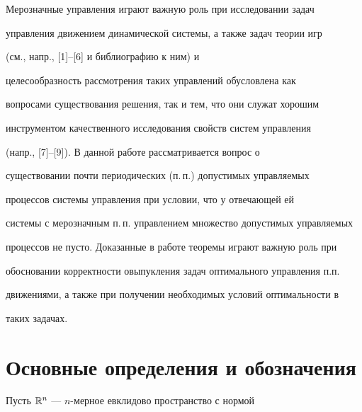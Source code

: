 \pagestyle{plain} %







\maketitle


\label{begin}








Мерозначные управления играют важную роль при исследовании задач


управления движением динамической системы, а также задач теории игр


(см., напр., [1]--[6] и библиографию к ним) и


целесообразность рассмотрения таких управлений обусловлена как


вопросами существования решения, так и тем, что они служат хорошим


инструментом качественного исследования свойств систем управления


(напр., [7]--[9]). В данной работе рассматривается вопрос о


существовании почти периодических (п.\,п.) допустимых управляемых


процессов системы управления при условии, что у отвечающей ей


системы с мерозначным п.\,п. управлением множество допустимых управляемых


процессов не пусто. Доказанные в работе теоремы играют важную роль при


обосновании корректности овыпукления задач оптимального управления п.п.


движениями, а также при получении необходимых условий оптимальности в


таких задачах.





\section{Основные определения и обозначения}





Пусть $\Bbb R^{n}$ --- $n$-мерное евклидово пространство с нормой


